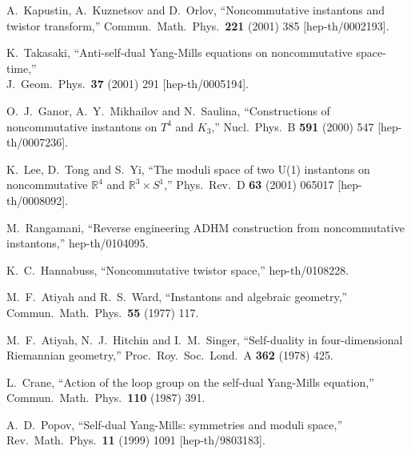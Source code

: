 \documentclass[a4paper,11pt]{article}
\numberwithin{equation}{section}
\newcommand{\R}{\mathbb R}
\begin{document}
{\begin{thebibliography}{99}
A.~Kapustin, A.~Kuznetsov and D.~Orlov,
``Noncommutative instantons and twistor transform,''
Commun.\ Math.\ Phys.\  {\bf 221} (2001) 385
[hep-th/0002193].

K.~Takasaki,
``Anti-self-dual Yang-Mills equations on noncommutative space-time,''\\
J.\ Geom.\ Phys.\  {\bf 37} (2001) 291
[hep-th/0005194].

O.~J.~Ganor, A.~Y.~Mikhailov and N.~Saulina,
``Constructions of noncommutative instantons on $T^4$ and $K_3$,''
Nucl.\ Phys.\ B {\bf 591} (2000) 547
[hep-th/0007236].

K.~Lee, D.~Tong and S.~Yi,
``The moduli space of two U(1) instantons on 
  noncommutative $\R^4$ and $\R^3\times S^1$,''
Phys.\ Rev.\ D {\bf 63} (2001) 065017
[hep-th/0008092].

M.~Rangamani,
``Reverse engineering ADHM construction from noncommutative instantons,''
hep-th/0104095.

K.~C.~Hannabuss,
``Noncommutative twistor space,''
hep-th/0108228.

M.~F.~Atiyah and R.~S.~Ward,
``Instantons and algebraic geometry,''\\
Commun.\ Math.\ Phys.\  {\bf 55} (1977) 117.

M.~F.~Atiyah, N.~J.~Hitchin and I.~M.~Singer,
``Self-duality in four-dimensional Riemannian geometry,''
Proc.\ Roy.\ Soc.\ Lond.\ A {\bf 362} (1978) 425.

L.~Crane,
``Action of the loop group on the self-dual Yang-Mills equation,''\\
Commun.\ Math.\ Phys.\  {\bf 110} (1987) 391.

A.~D.~Popov,
``Self-dual Yang-Mills: symmetries and moduli space,''\\
Rev.\ Math.\ Phys.\  {\bf 11} (1999) 1091
[hep-th/9803183].


\end{thebibliography}}
\end{document}
